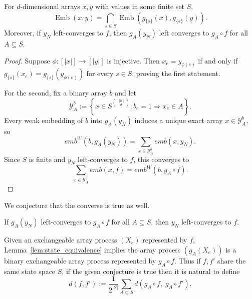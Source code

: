 \begin{subappendices}
\begin{lemma}
\label{lem:reducing_nonbinary_conv_to_binary}
    For $d$-dimensional arrays $x,y$ with values in some finite set $S$,
        \[\operatorname{Emb}(x,y)
        = \bigcap_{s \in S}\operatorname{Emb}(g_{\{s\}}(x),g_{\{s\}}(y)).\]
    \noindent Moreover, if $y_N$ left-converges to $f$, then $g_A(y_N)$ left
    converges to $g_A \circ f$ for all $A \subseteq S$.
\end{lemma}

\begin{proof}
    Suppose $\phi:[|x|] \to [|y|]$ is injective. Then $x_e=y_{\phi(e)}$
    if and only if $g_{\{s\}}(x_e)=g_{\{s\}}(y_{\phi(e)})$ for every
    $s\in S$, proving the first statement.

    For the second, fix a binary array $b$ and let
    \[
        \mathcal{Y}_A^b:=\left\{x\in S^{\binom{[|b|]}d}:
        b_e=1\Rightarrow x_e\in A\right\}.
    \]
    Every weak embedding of $b$ into $g_A(y_N)$ induces a unique exact array
    $x\in\mathcal{Y}_A^b$, so
    \[
        emb^W(b,g_A(y_N))=\sum_{x\in\mathcal{Y}_A^b}emb(x,y_N).
    \]
    Since $S$ is finite and $y_N$ left-converges to $f$, this converges to
    \[
        \sum_{x\in\mathcal{Y}_A^b}emb(x,f)=emb^W(b,g_A\circ f).
    \]
\end{proof}

\noindent We conjecture that the converse is true as well.

\begin{conjecture}
    If $g_A(y_N)$ left-converges to $g_A\circ f$ for all $A \subseteq S$, then $y_N$ left-converges to $f$.
\end{conjecture}

Given an exchangeable array process $(X_e)$ represented by $f$,
Lemma~\ref{lem:state_equivalence} implies the array process $(g_A(X_e))$ is
a binary exchangeable array process represented by $g_A \circ f$. Thus if $f,f'$ share
the same state space $S$, if the given conjecture is true then it is natural to define
%
\begin{equation}
    d(f,f') := \frac{1}{2^{|S|}} \sum_{A \subseteq S} d(g_A \circ f, \; g_A \circ f').
\end{equation}
%




\newpage

\end{subappendices}

